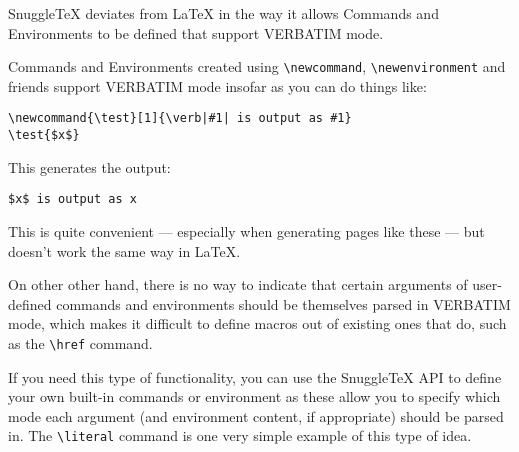 SnuggleTeX deviates from LaTeX in the way it allows Commands
and Environments to be defined that support VERBATIM mode.

Commands and Environments created using \verb|\newcommand|,
\verb|\newenvironment| and friends support VERBATIM mode insofar
as you can do things like:

\begin{verbatim}
\newcommand{\test}[1]{\verb|#1| is output as #1}
\test{$x$}
\end{verbatim}

This generates the output:

\begin{verbatim}
$x$ is output as x
\end{verbatim}

This is quite convenient --- especially when generating pages like these ---
but doesn't work the same way in LaTeX.

On other other hand, there is no way to indicate that certain arguments
of user-defined commands and environments should be themselves parsed in
VERBATIM mode, which makes it difficult to define macros out of existing
ones that do, such as the \verb|\href| command.

If you need this type of functionality, you can use the SnuggleTeX API to
define your own built-in commands or environment as these allow you to specify
which mode each argument (and environment content, if appropriate) should be
parsed in. The \verb|\literal| command is one very simple example of this
type of idea.
